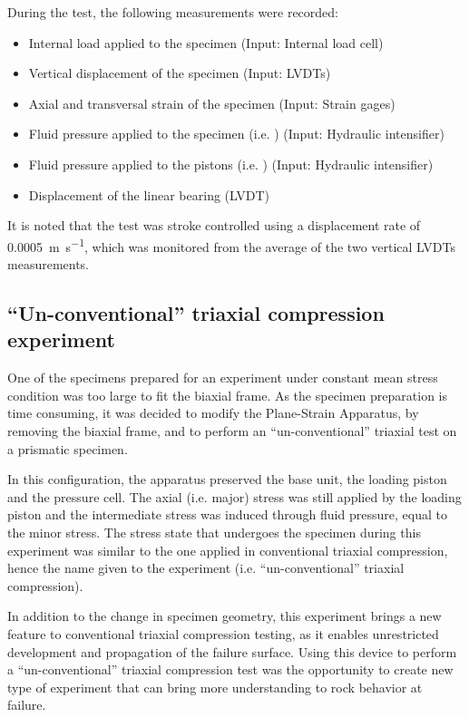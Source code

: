 During the test, the following measurements were recorded: 

\begin{itemize}
    \item Internal load applied to the specimen (Input: Internal load cell)
    \item Vertical displacement of the specimen (Input: LVDTs)
    \item Axial and transversal strain of the specimen (Input: Strain gages)
    \item Fluid pressure applied to the specimen (i.e. ) (Input: Hydraulic intensifier) 
    \item Fluid pressure applied to the pistons (i.e. ) (Input: Hydraulic intensifier)
    \item Displacement of the linear bearing (LVDT)
\end{itemize}

It is noted that the test was stroke controlled using a displacement rate of \SI{0.0005}{\meter\per\second}, which was monitored from the average of the two vertical LVDTs measurements.

\subsection{“Un-conventional” triaxial compression experiment}

One of the specimens prepared for an experiment under constant mean stress condition was too large to fit the biaxial frame. As the specimen preparation is time consuming, it was decided to modify the Plane-Strain Apparatus, by removing the biaxial frame, and to perform an “un-conventional” triaxial test on a prismatic specimen. 

In this configuration, the apparatus preserved the base unit, the loading piston and the pressure cell. The axial (i.e. major) stress was still applied by the loading piston and the intermediate stress was induced through fluid pressure, equal to the minor stress. The stress state that undergoes the specimen during this experiment was similar to the one applied in conventional triaxial compression, hence the name given to the experiment (i.e. “un-conventional” triaxial compression). 

In addition to the change in specimen geometry, this experiment brings a new feature to conventional triaxial compression testing, as it enables unrestricted development and propagation of the failure surface. Using this device to perform a “un-conventional” triaxial compression test was the opportunity to create new type of experiment that can bring more understanding to rock behavior at failure.

